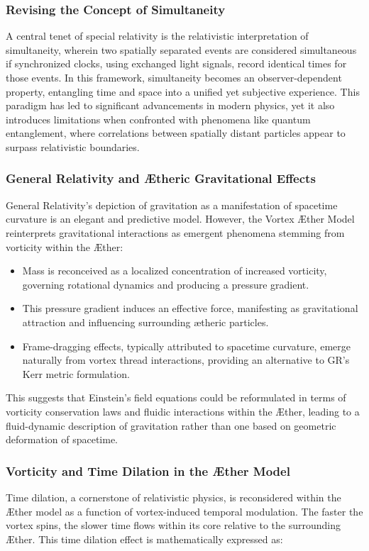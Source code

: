 \documentclass[a4paper,10pt]{article}
\begin{document}
\subsubsection*{Revising the Concept of Simultaneity}
A central tenet of special relativity is the relativistic interpretation of simultaneity, wherein two spatially separated events are considered simultaneous if synchronized clocks, using exchanged light signals, record identical times for those events.
In this framework, simultaneity becomes an observer-dependent property, entangling time and space into a unified yet subjective experience.
This paradigm has led to significant advancements in modern physics, yet it also introduces limitations when confronted with phenomena like quantum entanglement, where correlations between spatially distant particles appear to surpass relativistic boundaries.

\subsubsection*{General Relativity and Ætheric Gravitational Effects}
General Relativity's depiction of gravitation as a manifestation of spacetime curvature is an elegant and predictive model.
However, the Vortex Æther Model reinterprets gravitational interactions as emergent phenomena stemming from vorticity within the Æther:

\begin{itemize}
    \item Mass is reconceived as a localized concentration of increased vorticity, governing rotational dynamics and producing a pressure gradient.
    \item This pressure gradient induces an effective force, manifesting as gravitational attraction and influencing surrounding ætheric particles.
    \item Frame-dragging effects, typically attributed to spacetime curvature, emerge naturally from vortex thread interactions, providing an alternative to GR's Kerr metric formulation.
\end{itemize}
This suggests that Einstein's field equations could be reformulated in terms of vorticity conservation laws and fluidic interactions within the Æther, leading to a fluid-dynamic description of gravitation rather than one based on geometric deformation of spacetime.

\subsubsection*{Vorticity and Time Dilation in the Æther Model}
Time dilation, a cornerstone of relativistic physics, is reconsidered within the Æther model as a function of vortex-induced temporal modulation.
The faster the vortex spins, the slower time flows within its core relative to the surrounding Æther.
This time dilation effect is mathematically expressed as:
\end{document}
